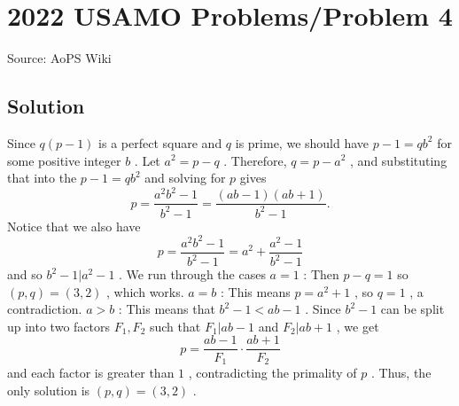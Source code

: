 \documentclass[12pt]{article}
\begin{document}
\section*{{2022 USAMO Problems/Problem 4}}
Source: AoPS Wiki

\subsection*{Solution}
Since $q(p-1)$ is a perfect square and $q$ is prime, we should have $p - 1 = qb^2$ for some positive integer $b$ . Let $a^2 = p - q$ . Therefore, $q = p - a^2$ , and substituting that into the $p - 1 = qb^2$ and solving for $p$ gives \[p = \frac{a^2b^2 - 1}{b^2 - 1} = \frac{(ab - 1)(ab + 1)}{b^2 - 1}.\] Notice that we also have \[p = \frac{a^2b^2 - 1}{b^2 - 1} = a^2 + \frac{a^2 - 1}{b^2 - 1}\] and so $b^2 - 1 | a^2 - 1$ . We run through the cases $a = 1$ : Then $p - q = 1$ so $(p, q) = (3, 2)$ , which works. $a = b$ : This means $p = a^2 + 1$ , so $q = 1$ , a contradiction. $a > b$ : This means that $b^2 - 1 < ab - 1$ . Since $b^2 - 1$ can be split up into two factors $F_1, F_2$ such that $F_1 | ab - 1$ and $F_2 | ab + 1$ , we get \[p = \frac{ab - 1}{F_1} \cdot \frac{ab + 1}{F_2}\] and each factor is greater than $1$ , contradicting the primality of $p$ . Thus, the only solution is $(p, q) = (3, 2)$ .
\end{document}
